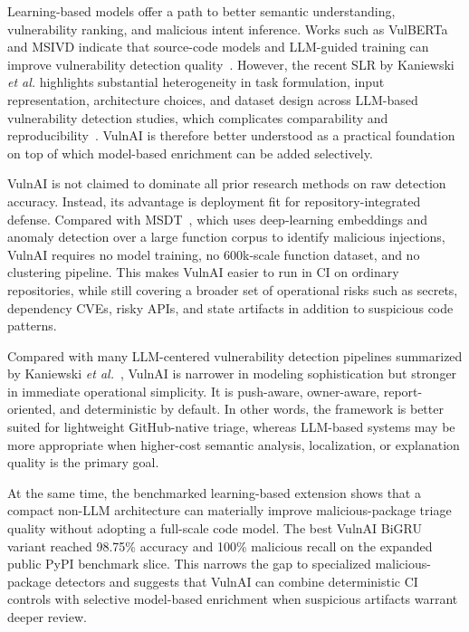 \documentclass[conference]{IEEEtran}
\begin{document}
Learning-based models offer a path to better semantic understanding, vulnerability ranking, and malicious intent inference. Works such as VulBERTa and MSIVD indicate that source-code models and LLM-guided training can improve vulnerability detection quality~\cite{hanif2022vulberta,yang2024msivd}. However, the recent SLR by Kaniewski \emph{et al.} highlights substantial heterogeneity in task formulation, input representation, architecture choices, and dataset design across LLM-based vulnerability detection studies, which complicates comparability and reproducibility~\cite{kaniewski2025slr}. VulnAI is therefore better understood as a practical foundation on top of which model-based enrichment can be added selectively.

VulnAI is not claimed to dominate all prior research methods on raw detection accuracy. Instead, its advantage is deployment fit for repository-integrated defense. Compared with MSDT~\cite{tsfaty2023malicious}, which uses deep-learning embeddings and anomaly detection over a large function corpus to identify malicious injections, VulnAI requires no model training, no 600k-scale function dataset, and no clustering pipeline. This makes VulnAI easier to run in CI on ordinary repositories, while still covering a broader set of operational risks such as secrets, dependency CVEs, risky APIs, and state artifacts in addition to suspicious code patterns.

Compared with many LLM-centered vulnerability detection pipelines summarized by Kaniewski \emph{et al.}~\cite{kaniewski2025slr}, VulnAI is narrower in modeling sophistication but stronger in immediate operational simplicity. It is push-aware, owner-aware, report-oriented, and deterministic by default. In other words, the framework is better suited for lightweight GitHub-native triage, whereas LLM-based systems may be more appropriate when higher-cost semantic analysis, localization, or explanation quality is the primary goal.

At the same time, the benchmarked learning-based extension shows that a compact non-LLM architecture can materially improve malicious-package triage quality without adopting a full-scale code model. The best VulnAI BiGRU variant reached 98.75\% accuracy and 100\% malicious recall on the expanded public PyPI benchmark slice. This narrows the gap to specialized malicious-package detectors and suggests that VulnAI can combine deterministic CI controls with selective model-based enrichment when suspicious artifacts warrant deeper review.
\end{document}
